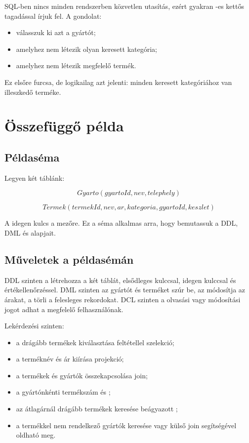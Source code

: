 SQL-ben nincs minden rendszerben közvetlen  utasítás, ezért gyakran -es kettős tagadással írjuk fel. A gondolat:

\begin{itemize}
  \item válasszuk ki azt a gyártót;
  \item amelyhez nem létezik olyan keresett kategória;
  \item amelyhez nem létezik megfelelő termék.
\end{itemize}

Ez elsőre furcsa, de logikailag azt jelenti: minden keresett kategóriához van illeszkedő terméke.


\section{Összefüggő példa}

\subsection{Példaséma}

Legyen két táblánk:

\[
  Gyarto(gyartoId, nev, telephely)
\]

\[
  Termek(termekId, nev, ar, kategoria, gyartoId, keszlet)
\]

A  idegen kulcs a  mezőre. Ez a séma alkalmas arra, hogy bemutassuk a DDL, DML és  alapjait.

\subsection{Műveletek a példasémán}

DDL szinten a  létrehozza a két táblát, elsődleges kulccsal, idegen kulccsal és értékellenőrzéssel. DML szinten az  gyártót és terméket szúr be, az  módosítja az árakat, a  törli a felesleges rekordokat. DCL szinten a  olvasási vagy módosítási jogot adhat a megfelelő felhasználónak.

Lekérdezési szinten:

\begin{itemize}
  \item a drágább termékek kiválasztása  feltétellel szelekció;
  \item a terméknév és ár kiírása projekció;
  \item a termékek és gyártók összekapcsolása join;
  \item a gyártónkénti termékszám  és ;
  \item az átlagárnál drágább termékek keresése beágyazott ;
  \item a termékkel nem rendelkező gyártók keresése  vagy külső join segítségével oldható meg.
\end{itemize}

